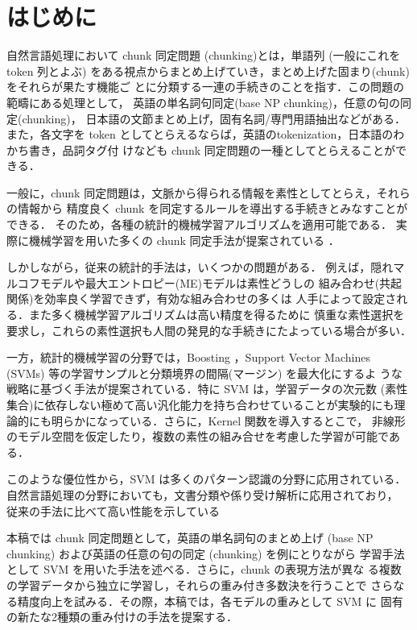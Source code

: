 \section{はじめに}
自然言語処理において chunk 同定問題 (chunking)とは，単語列 (一般にこれを
token 列とよぶ) をある視点からまとめ上げていき，まとめ上げた固まり(chunk)をそれらが果たす機能ご
とに分類する一連の手続きのことを指す．この問題の範疇にある処理として，
英語の単名詞句同定(base NP chunking)，任意の句の同定(chunking)，
日本語の文節まとめ上げ，固有名詞/専門用語抽出などがある．また，各文字を token 
としてとらえるならば，英語のtokenization，日本語のわかち書き，品詞タグ付
けなども chunk 同定問題の一種としてとらえることができる．

一般に，chunk 同定問題は，文脈から得られる情報を素性としてとらえ，それらの情報から
精度良く chunk を同定するルールを導出する手続きとみなすことができる．
そのため，各種の統計的機械学習アルゴリズムを適用可能である．
実際に機械学習を用いた多くの chunk 同定手法が提案されている
\cite{Ramshaw95,Tjong_Kim_Sang2000a,Tjong_Kim_Sang2000b,Tjong_Kim_Sang2000d,内元00,Sassano00b}．

しかしながら，従来の統計的手法は，いくつかの問題がある．
例えば，隠れマルコフモデルや最大エントロピー(ME)モデルは素性どうしの
組み合わせ(共起関係)を効率良く学習できず，有効な組み合わせの多くは
人手によって設定される．また多く機械学習アルゴリズムは高い精度を得るために
慎重な素性選択を要求し，これらの素性選択も人間の発見的な手続きにたよっている場合が多い．

一方，統計的機械学習の分野では，Boosting \cite{Freund96}，Support Vector Machines (SVMs)
\cite{Vapnik95a,Vapnik98}等の学習サンプルと分類境界の間隔(マージン) を最大化にするよ
うな戦略に基づく手法が提案されている．特に SVM は，学習データの次元数
(素性集合)に依存しない極めて高い汎化能力を持ち合わせていることが実験的にも理
論的にも明らかになっている．さらに，Kernel 関数を導入するとこで，
非線形のモデル空間を仮定したり，複数の素性の組み合せを考慮した学習が可能である．

このような優位性から，SVM は多くのパターン認識の分野に応用されている．
自然言語処理の分野においても，文書分類や係り受け解析に応用されており，
従来の手法に比べて高い性能を示している\cite{Joachims99,平2000,kudo2000b,kudo2000c,工藤02}

本稿では chunk 同定問題として，英語の単名詞句のまとめ上げ (base
NP chunking) および英語の任意の句の同定 (chunking) を例にとりながら
学習手法として SVM を用いた手法を述べる．さらに，chunk の表現方法が異な
る複数の学習データから独立に学習し，それらの重み付き多数決を行うことで
さらなる精度向上を試みる．その際，本稿では，各モデルの重みとして SVM に
固有の新たな2種類の重み付けの手法を提案する．

